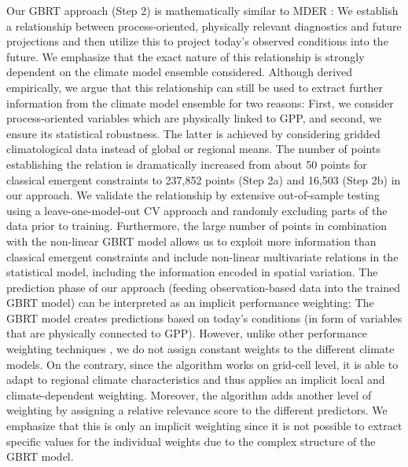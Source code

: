 Our \ac{GBRT} approach (Step 2) is mathematically similar to \ac{MDER}
\autocite{Karpechko2013, Senftleben2020, Wenzel2016a}: We establish a
relationship between process-oriented, physically relevant diagnostics and
future projections and then utilize this to project today's observed conditions
into the future. We emphasize that the exact nature of this relationship is
strongly dependent on the climate model ensemble considered. Although derived
empirically, we argue that this relationship can still be used to extract
further information from the climate model ensemble for two reasons: First, we
consider process-oriented variables which are physically linked to \ac{GPP},
and second, we ensure its statistical robustness. The latter is achieved by
considering gridded climatological data instead of global or regional means.
The number of points establishing the relation is dramatically increased from
about 50 points for classical emergent constraints to 237,852 points (Step 2a)
and 16,503 (Step 2b) in our approach. We validate the relationship by extensive
out-of-sample testing using a leave-one-model-out \ac{CV} approach and randomly
excluding parts of the data prior to training. Furthermore, the large number of
points in combination with the non-linear \ac{GBRT} model allows us to exploit
more information than classical emergent constraints and include non-linear
multivariate relations in the statistical model, including the information
encoded in spatial variation. The prediction phase of our approach (feeding
observation-based data into the trained \ac{GBRT} model) can be interpreted as
an implicit performance weighting: The \ac{GBRT} model creates predictions
based on today's conditions (in form of variables that are physically connected
to \ac{GPP}). However, unlike other performance weighting techniques
\autocite{Knutti2017a, Sanderson2017}, we do not assign constant weights to the
different climate models. On the contrary, since the algorithm works on
grid-cell level, it is able to adapt to regional climate characteristics and
thus applies an implicit local and climate-dependent weighting. Moreover, the
algorithm adds another level of weighting by assigning a relative relevance
score to the different predictors. We emphasize that this is only an implicit
weighting since it is not possible to extract specific values for the
individual weights due to the complex structure of the \ac{GBRT} model.

